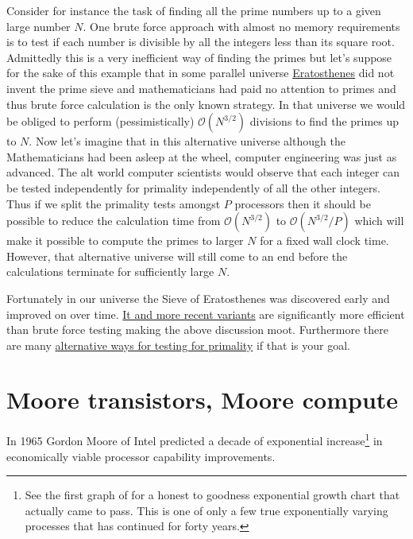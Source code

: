 Consider for instance the task of finding all the prime numbers up to a given large number $N$. One brute force approach with almost no memory requirements is to test if each number is divisible by all the integers less than its square root. Admittedly this is a very inefficient way of finding the primes but let's suppose for the sake of this example that in some parallel universe  \href{https://en.wikipedia.org/wiki/Sieve_of_Eratosthenes}{Eratosthenes} did not invent the prime sieve and mathematicians had paid no attention to primes and thus brute force calculation is the only known strategy. In that universe we would be obliged to perform (pessimistically) $\mathcal{O}(N^{3/2})$ divisions to find the primes up to $N$. Now let's imagine that in this alternative universe although the Mathematicians had been asleep at the wheel, computer engineering was just as advanced. The alt world computer scientists would observe that each integer can be tested independently for primality independently of all the other integers. Thus if we split the primality tests amongst $P$ processors then it should be possible to reduce the calculation time from $\mathcal{O}(N^{3/2})$ to $\mathcal{O}(N^{3/2}/P)$ which will make it possible to compute the primes to larger $N$ for a fixed wall clock time. However, that alternative universe will still come to an end before the calculations terminate for sufficiently large $N$.

Fortunately in our universe the Sieve of Eratosthenes was discovered early and improved on over time. \href{https://en.wikipedia.org/wiki/Sieve_of_Eratosthenes}{It and more recent variants} are significantly more efficient than brute force testing making the above discussion moot. Furthermore there are many \href{https://en.wikipedia.org/wiki/Primality_test}{alternative ways for testing for primality} if that is your goal.

\section{Moore transistors, Moore compute}

In 1965 Gordon Moore of Intel predicted a decade of exponential increase\footnote{See the first graph of \cite{moore1965cramming} for a honest to goodness  exponential growth chart that actually came to pass. This is one of only a few true exponentially varying processes that has continued for forty years.} in economically viable processor capability improvements. 

